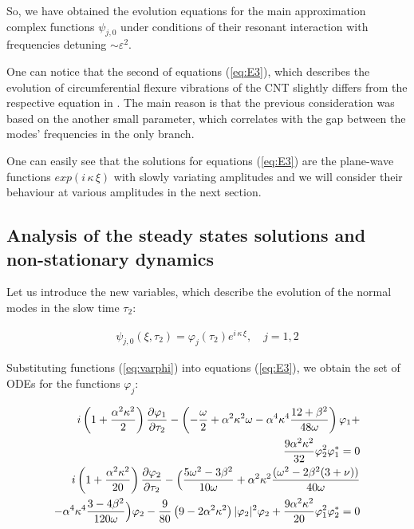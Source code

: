So, we have obtained the evolution equations for the main approximation complex functions $\psi_{j,0}$ under conditions of their resonant interaction with frequencies detuning $\sim \varepsilon^2$.

One can notice that the second of equations (\ref{eq:E3}), which describes the evolution of circumferential flexure vibrations of the CNT slightly differs from the respective equation in \cite{Smirnov2016PhysD}.
The main reason is that the previous consideration was based on the another small parameter, which correlates with the gap between the modes' frequencies in the only branch.

One can easily see that  the solutions for equations (\ref{eq:E3}) are the plane-wave functions $exp( i \, \kappa \, \xi)$ with slowly variating amplitudes and we will consider their behaviour at various amplitudes in the next section.

\subsection{Analysis of the steady states solutions and non-stationary dynamics}

Let us introduce the new variables, which describe the evolution of the normal modes in the slow time $\tau_{2}$:

\begin{eqnarray}\label{eq:varphi}
\psi_{j,0}(\xi, \tau_{2})=\varphi_{j} (\tau_{2}) e^{i \,\kappa \, \xi}, \quad j=1,2
\end{eqnarray}

Substituting functions (\ref{eq:varphi}) into equations (\ref{eq:E3}), we obtain the set of ODEs for the functions $\varphi_{j}$:

\begin{eqnarray}\label{eq:eqphi1}
i   \left(1+\frac{\alpha^2 \kappa^2}{2} \right) \frac{\partial \varphi_{1}}{\partial \tau_2} - \left(-\frac{\omega}{2}+\alpha^2 \kappa^2 \omega - \alpha^4 \kappa^4 \frac{12+\beta^2}{48 \omega} \right) \varphi_{1} +  \nonumber  \\   \frac{9 \alpha^2 \kappa^2}{32} \varphi_{2}^2 \varphi_{1}^{*} =0  \nonumber  \\
i   \left(1+\frac{\alpha^2 \kappa^2}{20} \right) \frac{\partial \varphi_{2}}{\partial \tau_2} - \Bigl( \frac{5\omega^2-3 \beta^2}{10\omega}+\alpha^2 \kappa^2\frac{ (\omega^2 - 2\beta^2(3+\nu))}{40 \omega} \\
 -   \alpha^4 \kappa^4 \frac{3-4 \beta^2}{120 \omega} \Bigr) \varphi_{2} - \frac{9}{80} \left( 9-2 \alpha^2 \kappa^2 \right) | \varphi_{2} |^2 \varphi_{2} + \frac{9 \alpha^2 \kappa^2}{20} \varphi_{1}^2 \varphi_{2}^{*} = 0 \nonumber
\end{eqnarray}

